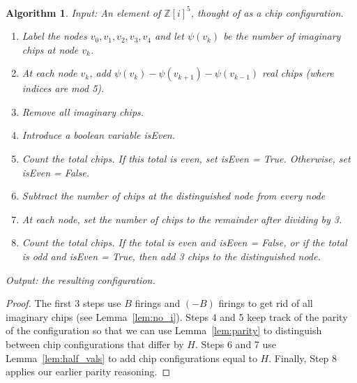 \documentclass[12p]{amsart}
\numberwithin{equation}{section}
\theoremstyle{plain}
\newtheorem{alg}[thm]{Algorithm}
\theoremstyle{definition}
\newcommand{\Z}{\mathbb {Z}}
\begin{document}
\begin{alg}\label{alg:stabilize}
    Input: An element of $\Z[i]^5$, thought of as a chip configuration.
    \begin{enumerate}[1.]
        \item Label the nodes $v_0,v_1,v_2,v_3,v_4$ and let $\psi(v_k)$ be the number of imaginary chips at node $v_k$. 
        \item At each node $v_k$, add $\psi(v_{k}) - \psi(v_{k+1}) - \psi(v_{k-1})$ real chips (where indices are mod 5). 
        \item Remove all imaginary chips. 
        \item Introduce a boolean variable isEven.
        \item Count the total chips. If this total is even, set isEven = True. Otherwise, set isEven = False. 
        \item Subtract the number of chips at the distinguished node from every node
        \item At each node, set the number of chips to the remainder after dividing by 3. 
        \item Count the total chips. If the total is even and isEven = False, or if the total is odd and isEven = True, then add 3 chips to the distinguished node. 
    \end{enumerate}    
    Output: the resulting configuration.
\end{alg}
\begin{proof}
The first 3 steps use $B$ firings and $(-B)$ firings to get rid of all imaginary chips (see Lemma~\ref{lem:no_i}). Steps 4 and 5 keep track of the parity of the configuration so that we can use Lemma~\ref{lem:parity} to distinguish between chip configurations that differ by $H$. Steps 6 and 7 use Lemma~\ref{lem:half_vals} to add chip configurations equal to $H$. Finally, Step 8 applies our earlier parity reasoning. 
\end{proof}
\end{document}
